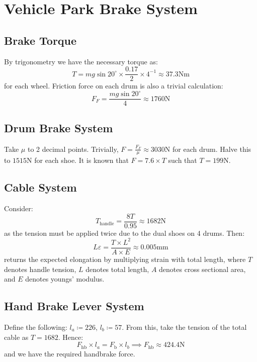 \documentclass[../main.tex]{subfiles}
\begin{document}
\section{Vehicle Park Brake System}
\subsection{Brake Torque}
By trigonometry we have the necessary torque as:
\[T=mg\sin20^\circ\times\dfrac{0.17}{2}\times4^{-1}\approx 37.3 \mathrm{Nm}\]
for each wheel.
Friction force on each drum is also a trivial calculation:
\[F_F=\dfrac{mg\sin20^\circ}{4}\approx1760 \mathrm{N}\]

\subsection{Drum Brake System}
Take $\mu$ to 2 decimal points. Trivially, $F = \frac{F_F}{\mu} \approx 3030 \mathrm{N}$ for each drum.
Halve this to $1515 \mathrm{N}$ for each shoe.
It is known that $F = 7.6\times T$ such that $T=199\mathrm{N}$.
\subsection{Cable System}
Consider:
\[T_\text{handle}=\dfrac{8T}{0.95}\approx 1682 \mathrm{N}\]
as the tension must be applied twice due to the dual shoes on 4 drums.
Then:
\[ L\varepsilon = \dfrac{T\times L^2}{A\times E} \approx0.005 \mathrm{mm}\]
returns the expected elongation by multiplying strain with total length, where $T$ denotes handle tension, $L$ denotes total length, $A$ denotes cross sectional area, and $E$ denotes youngs' modulus.
\subsection{Hand Brake Lever System}
Define the following: $l_a\coloneq226$, $l_b\coloneq57$.
From this, take the tension of the total cable as $T=1682$.
Hence:
\[F_\text{hb} \times l_a = F_\text{b} \times l_b \implies F_\text{hb} \approx 424.4 \mathrm{N}\]
and we have the required handbrake force.
\end{document}
